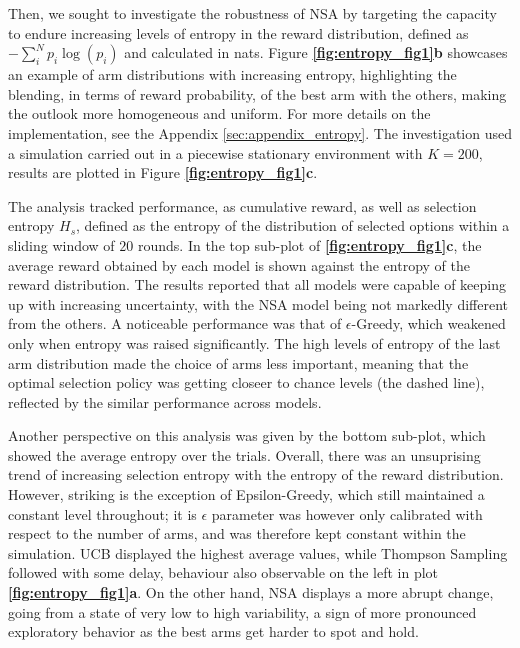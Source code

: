 
\noindent Then, we sought to investigate the robustness of NSA by targeting the capacity to endure increasing levels of entropy in the reward distribution, defined as $-\sum^{N}_{i} p_{i} \log(p_{i})$ and calculated in nats.
Figure \textbf{\ref{fig:entropy_fig1}b} showcases an example of arm distributions with increasing entropy, highlighting the blending, in terms of reward probability, of the best arm with the others, making the outlook more homogeneous and uniform.
For more details on the implementation, see the Appendix \ref{sec:appendix_entropy}.
The investigation used a simulation carried out in a piecewise stationary environment with $K=200$, results are plotted in Figure \textbf{\ref{fig:entropy_fig1}c}.

The analysis tracked performance, as cumulative reward, as well as selection entropy $H_{s}$, defined as the entropy of the distribution of selected options within a sliding window of $20$ rounds.
In the top sub-plot of \textbf{\ref{fig:entropy_fig1}c}, the average reward obtained by each model is shown against the entropy of the reward distribution.
The results reported that all models were capable of keeping up with increasing uncertainty, with the NSA model being not markedly different from the others.
A noticeable performance was that of $\epsilon$-Greedy, which weakened only when entropy was raised significantly.
The high levels of entropy of the last arm distribution made the choice of arms less important, meaning that the optimal selection policy was getting closeer to chance levels (the dashed line), reflected by the similar performance across models.

Another perspective on this analysis was given by the bottom sub-plot, which showed the average entropy over the trials.
Overall, there was an unsuprising trend of increasing selection entropy with the entropy of the reward distribution.
However, striking is the exception of Epsilon-Greedy, which still maintained a constant level throughout; it is $\epsilon$ parameter was however only calibrated with respect to the number of arms, and was therefore kept constant within the simulation.
UCB displayed the highest average values, while Thompson Sampling followed with some delay, behaviour also observable on the left in plot \textbf{\ref{fig:entropy_fig1}a}.
On the other hand, NSA displays a more abrupt change, going from a state of very low to high variability, a sign of more pronounced exploratory behavior as the best arms get harder to spot and hold.

